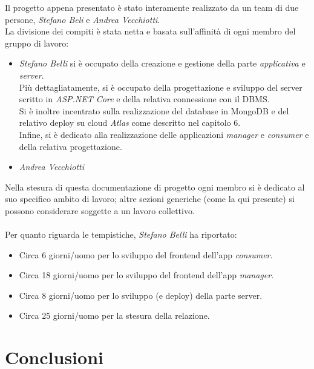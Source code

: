 \documentclass[12pt]{article}
\begin{document}
\newpage

Il progetto appena presentato è stato interamente realizzato da un team di due persone, \textit{Stefano Beli} e \textit{Andrea Vecchiotti}.\\
La divisione dei compiti è stata netta e basata sull'affinità di ogni membro del gruppo di lavoro:
\begin{itemize}
	\item \textit{Stefano Belli} si è occupato della creazione e gestione della parte \textit{applicativa} e \textit{server}.\\
	Più dettagliatamente, si è occupato della progettazione e sviluppo del server scritto in \textit{ASP.NET Core} e della relativa connessione con il DBMS.\\
	Si è inoltre incentrato sulla realizzazione del database in MongoDB e del relativo deploy su cloud \textit{Atlas} come descritto nel capitolo 6.\\
	Infine, si è dedicato alla realizzazione delle applicazioni \textit{manager} e \textit{consumer} e della relativa progettazione.
	\item \textit{Andrea Vecchiotti}
\end{itemize}
Nella stesura di questa documentazione di progetto ogni membro si è dedicato al suo specifico ambito di lavoro; altre sezioni generiche (come la qui presente) si possono considerare soggette a un lavoro collettivo.\\\\
Per quanto riguarda le tempistiche, \textit{Stefano Belli}  ha riportato:
\begin{itemize}
\item Circa 6 giorni/uomo per lo sviluppo del frontend dell'app \textit{consumer}.
\item Circa 18 giorni/uomo per lo sviluppo del frontend dell'app \textit{manager}.
\item Circa 8 giorni/uomo per lo sviluppo (e deploy) della parte server.
\item Circa 25 giorni/uomo per la stesura della relazione.
\end{itemize}


\section{Conclusioni}
\end{document}

